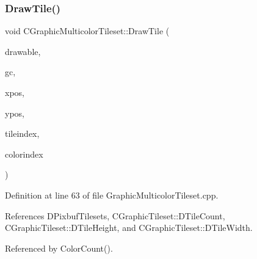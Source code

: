 \subsubsection{\texorpdfstring{Draw\+Tile()}{DrawTile()}}
{\footnotesize\ttfamily void C\+Graphic\+Multicolor\+Tileset\+::\+Draw\+Tile (\begin{DoxyParamCaption}\item[{Gdk\+Drawable $\ast$}]{drawable,  }\item[{Gdk\+GC $\ast$}]{gc,  }\item[{gint}]{xpos,  }\item[{gint}]{ypos,  }\item[{int}]{tileindex,  }\item[{int}]{colorindex }\end{DoxyParamCaption})}



Definition at line 63 of file Graphic\+Multicolor\+Tileset.\+cpp.



References D\+Pixbuf\+Tilesets, C\+Graphic\+Tileset\+::\+D\+Tile\+Count, C\+Graphic\+Tileset\+::\+D\+Tile\+Height, and C\+Graphic\+Tileset\+::\+D\+Tile\+Width.



Referenced by Color\+Count().


